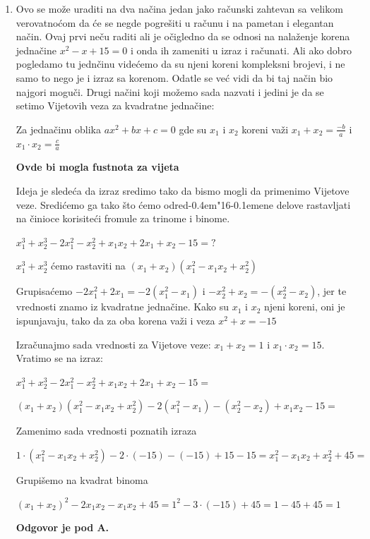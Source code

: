 \documentclass[a4paper,12pt]{report}
\def\dj{d\kern-0.4em\char"16\kern-0.1em}
\begin{document}
\begin{enumerate}[1.]
\item Ovo se mo\v{z}e uraditi na dva na\v{c}ina jedan jako ra\v{c}unski zahtevan sa velikom verovatno\'{c}om da \'{c}e se negde pogre\v{s}iti u ra\v{c}unu i na pametan i elegantan na\v{c}in. Ovaj prvi ne\v{c}u raditi ali je o\v{c}igledno da se odnosi na nala\v{z}enje korena jedna\v{c}ine $x^2 - x + 15 = 0$ i onda ih zameniti u izraz i ra\v{c}unati. Ali ako dobro pogledamo tu jedn\v{c}inu vide\'{c}emo da su njeni koreni kompleksni brojevi, i ne samo to nego je i izraz sa korenom. Odatle se ve\'{c} vidi da bi taj na\v{c}in bio najgori mogu\v{c}i. Drugi na\v{c}ini koji mo\v{z}emo sada nazvati i jedini je da se setimo Vijetovih veza za kvadratne jedna\v{c}ine:
\par Za jedna\v{c}inu oblika $ax^2 + bx + c = 0$ gde su $x_1$ i $x_2$ koreni va\v{z}i $x_1 + x_2 = \frac{-b}{a}$ i $x_1 \cdot x_2 = \frac{c}{a}$
\par  \textbf{Ovde bi mogla fustnota za vijeta}
\par Ideja je slede\'{c}a da izraz sredimo tako da bismo mogli da primenimo Vijetove veze. Sredi\'{c}emo ga tako \v{s}to \'{c}emo odre\dj{}ene delove rastavljati na \v{c}inioce korisite\'{c}i fromule za trinome i binome.
\par $x_1^3 + x_2^3 - 2x_1^2 - x_2^2 + x_1x_2 + 2x_1 + x_2 -15 = ?$
\par $x_1^3 + x_2^3$ \'{c}emo rastaviti na $(x_1 + x_2)(x_1^2 -x_1x_2 + x_2^2 )$
\par Grupisa\'{c}emo $-2x_1^2 +2x_1 = -2(x_1^2 -x_1)$ i $-x_2^2 +x_2 = - (x_2^2 -x_2)$, jer te vrednosti znamo iz kvadratne jedna\v{c}ine. Kako su $x_1$ i $x_2$ njeni koreni, oni je ispunjavaju, tako da za oba korena va\v{z}i i veza $x^2 + x = -15$
\par Izra\v{c}unajmo sada vrednosti za Vijetove veze: $x_1 + x_2 = 1$ i $x_1 \cdot x_2 = 15$. Vratimo se na izraz:
\par $x_1^3 + x_2^3 - 2x_1^2 - x_2^2 + x_1x_2 + 2x_1 + x_2 -15 = $
\par $(x_1 + x_2)(x_1^2 -x_1x_2 + x_2^2 ) -2(x_1^2 -x_1) - (x_2^2 -x_2) +x_1x_2 - 15=  $
\par Zamenimo sada vrednosti poznatih izraza
\par $ 1 \cdot(x_1^2 -x_1x_2 + x_2^2 ) -2 \cdot(-15) - (-15) +15 - 15 = x_1^2 -x_1x_2 + x_2^2 + 45 = $
\par Grupi\v{s}emo na kvadrat binoma
\par $(x_1 + x_2)^2 - 2x_1x_2 - x_1x_2 + 45 = 1^2 -3 \cdot (-15) + 45 = 1 - 45 + 45 = 1$
\par \textbf{Odgovor je pod A.}


\end{enumerate}
\end{document}
